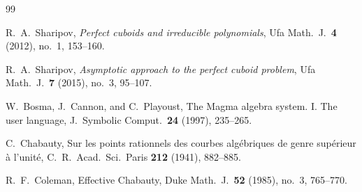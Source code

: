 \documentclass[12pt]{article}
\theoremstyle{remark}
\theoremstyle{definition}
\begin{document}

\begingroup
\footnotesize
\begin{thebibliography}{99}

R.~A.~Sharipov,
\newblock \emph{Perfect cuboids and irreducible polynomials},
\newblock Ufa Math.\ J.\ \textbf{4} (2012), no.~1, 153--160.

R.~A.~Sharipov,
\newblock \emph{Asymptotic approach to the perfect cuboid problem},
\newblock Ufa Math.\ J.\ \textbf{7} (2015), no.~3, 95--107.

W.~Bosma, J.~Cannon, and C.~Playoust,
\newblock The Magma algebra system. {I}. The user language,
\newblock J.\ Symbolic Comput.\ \textbf{24} (1997), 235--265.

C.~Chabauty,
\newblock Sur les points rationnels des courbes alg{\'e}briques de genre sup{\'e}rieur \`{a} l'unit{\'e},
\newblock C.\ R.\ Acad.\ Sci.\ Paris \textbf{212} (1941), 882--885.

R.~F.~Coleman,
\newblock Effective Chabauty,
\newblock Duke Math.\ J.\ \textbf{52} (1985), no.~3, 765--770.

\end{thebibliography}
\endgroup
\end{document}
